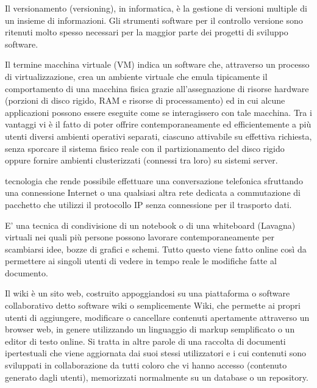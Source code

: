 \documentclass{scalatekids-article}
\begin{document}
   Il versionamento (versioning), in informatica, è la gestione di versioni multiple di un insieme di informazioni.
  Gli strumenti software per il controllo versione sono ritenuti molto spesso necessari per la maggior parte dei progetti di sviluppo software.

   Il termine macchina virtuale (VM) indica un software che, attraverso un processo di virtualizzazione, crea un ambiente virtuale che emula tipicamente il comportamento di una macchina fisica grazie all'assegnazione di risorse hardware (porzioni di disco rigido, RAM e risorse di processamento) ed in cui alcune applicazioni possono essere eseguite come se interagissero con tale macchina.
  Tra i vantaggi vi è il fatto di poter offrire contemporaneamente ed efficientemente a più utenti diversi ambienti operativi separati, ciascuno attivabile su effettiva richiesta, senza sporcare il sistema fisico reale con il partizionamento del disco rigido oppure fornire ambienti clusterizzati (connessi tra loro) su sistemi server.

   tecnologia che rende possibile effettuare una conversazione telefonica sfruttando una connessione Internet o una qualsiasi altra rete dedicata a commutazione di pacchetto che utilizzi il protocollo IP senza connessione per il trasporto dati.


   E' una tecnica di condivisione di un notebook o di una whiteboard (Lavagna) virtuali nei quali più persone possono lavorare contemporaneamente per scambiarsi idee, bozze di grafici e schemi.
  Tutto questo viene fatto online così da permettere ai singoli utenti di vedere in tempo reale le modifiche fatte al documento.

   Il wiki è un sito web, costruito appoggiandosi su una piattaforma o software collaborativo detto software wiki o semplicemente Wiki, che permette ai propri utenti di aggiungere, modificare o cancellare contenuti apertamente attraverso un browser web, in genere utilizzando un linguaggio di markup semplificato o un editor di testo online.
  Si tratta in altre parole di una raccolta di documenti ipertestuali che viene aggiornata dai suoi stessi utilizzatori e i cui contenuti sono sviluppati in collaborazione da tutti coloro che vi hanno accesso (contenuto generato dagli utenti), memorizzati normalmente su un database o un repository.



\end{document}
